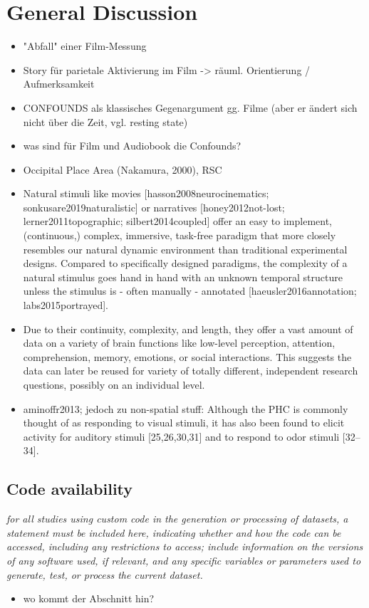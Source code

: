 \documentclass[english]{article}
\begin{document}
\section*{General Discussion}
\begin{itemize}
\item "Abfall" einer Film-Messung
\item Story für parietale Aktivierung im Film -> räuml. Orientierung / Aufmerksamkeit
\item CONFOUNDS als klassisches Gegenargument gg. Filme (aber er ändert sich nicht über die Zeit, vgl. resting state)
\item was sind für Film und Audiobook die Confounds?
\item Occipital Place Area (Nakamura, 2000), RSC
\item Natural stimuli like movies [hasson2008neurocinematics; sonkusare2019naturalistic] or narratives [honey2012not-lost; lerner2011topographic; silbert2014coupled] offer an easy to implement, (continuous,) complex, immersive, task-free paradigm that more closely resembles our natural dynamic environment than traditional experimental designs. Compared to specifically designed paradigms, the complexity of a natural stimulus goes hand in hand with an unknown temporal structure unless the stimulus is - often manually - annotated [haeusler2016annotation; labs2015portrayed].
\item Due to their continuity, complexity, and length, they offer a vast amount of data on a variety of brain functions like low-level perception, attention, comprehension, memory, emotions, or social interactions. This suggests the data can later be reused for variety of totally different, independent research questions, possibly on an individual level.
\item aminoffr2013; jedoch zu non-spatial stuff: Although the PHC is commonly thought of as responding to visual stimuli, it has also been found to elicit activity for auditory stimuli [25,26,30,31] and to respond to odor stimuli [32–34].
\end{itemize}

\subsection*{Code availability}
\emph{for all studies using custom code in the generation or processing of datasets,
a statement must be included here, indicating whether and how the code can be
accessed, including any restrictions to access; include information on the versions
of any software used, if relevant, and any specific variables or parameters used to
generate, test, or process the current dataset. }
\begin{itemize}
\item wo kommt der Abschnitt hin?
\end{itemize}
\end{document}
